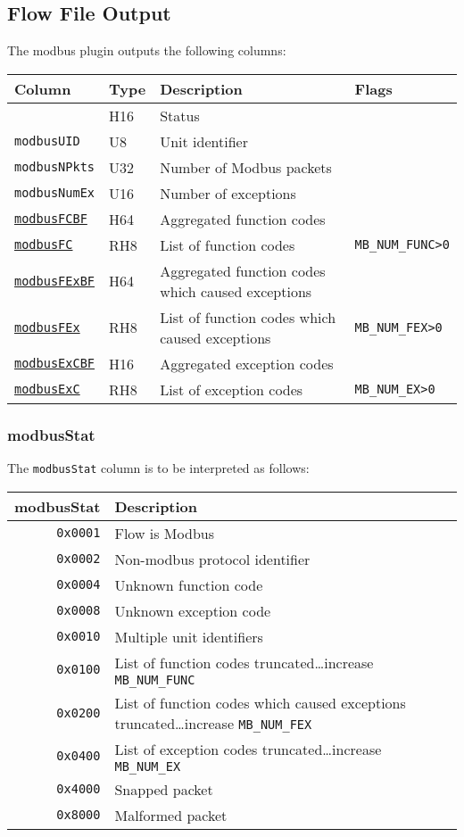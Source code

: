 \documentclass[documentation]{subfiles}
\begin{document}
\subsection{Flow File Output}
The modbus plugin outputs the following columns:
\begin{longtable}{llll}
    \toprule
    {\bf Column} & {\bf Type} & {\bf Description} & {\bf Flags}\\
    \midrule\endhead%
    {\tt \nameref{modbusStat}} & H16 & Status\\
    {\tt modbusUID}   & U8  & Unit identifier\\
    {\tt modbusNPkts} & U32 & Number of Modbus packets\\
    {\tt modbusNumEx} & U16 & Number of exceptions\\
    {\tt \hyperref[modbusFC]{modbusFCBF}}   & H64 & Aggregated function codes\\
    {\tt \hyperref[modbusFC]{modbusFC}}     & RH8 & List of function codes & {\tt MB\_NUM\_FUNC>0}\\
    {\tt \hyperref[modbusFEx]{modbusFExBF}} & H64 & Aggregated function codes which caused exceptions\\
    {\tt \hyperref[modbusFEx]{modbusFEx}}   & RH8 & List of function codes which caused exceptions & {\tt MB\_NUM\_FEX>0}\\
    {\tt \hyperref[modbusExC]{modbusExCBF}} & H16 & Aggregated exception codes\\
    {\tt \hyperref[modbusExC]{modbusExC}}   & RH8 & List of exception codes & {\tt MB\_NUM\_EX>0}\\
    \bottomrule
\end{longtable}

\subsubsection{modbusStat}\label{modbusStat}
The {\tt modbusStat} column is to be interpreted as follows:
\begin{longtable}{rl}
    \toprule
    {\bf modbusStat} & {\bf Description}\\
    \midrule\endhead%
    {\tt 0x0001} & Flow is Modbus\\
    {\tt 0x0002} & Non-modbus protocol identifier\\
    {\tt 0x0004} & Unknown function code\\
    {\tt 0x0008} & Unknown exception code\\
    {\tt 0x0010} & Multiple unit identifiers\\
    {\tt 0x0100} & List of function codes truncated\ldots increase {\tt MB\_NUM\_FUNC}\\
    {\tt 0x0200} & List of function codes which caused exceptions truncated\ldots increase {\tt MB\_NUM\_FEX}\\
    {\tt 0x0400} & List of exception codes truncated\ldots increase {\tt MB\_NUM\_EX}\\
    {\tt 0x4000} & Snapped packet\\
    {\tt 0x8000} & Malformed packet\\
    \bottomrule
\end{longtable}
\end{document}

